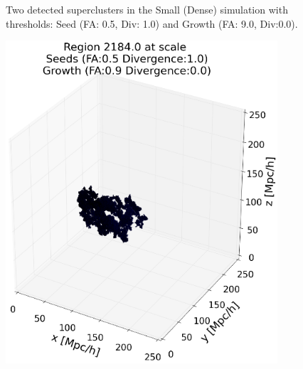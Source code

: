 \documentclass[12pt]{article}
\begin{document}
\begin{figure}[ht]
\begin{minipage}{.5\textwidth}
\end{minipage}
\label{fg:detected_small_51_90}
\caption{Two detected superclusters in the Small (Dense) simulation with thresholds: Seed (FA: 0.5, Div: 1.0) and Growth (FA: 9.0, Div:0.0). }
\end{figure}
\FloatBarrier

\begin{figure}[ht]
\centering
\begin{minipage}{.5\textwidth}
  \centering
  \includegraphics[width=0.9\textwidth]{groups/3d/seeds_FA_5/region_2184_scale_seeds_FA_05_Trace_10_search_FA_09_Trace_00_.png} %
\end{minipage}%
\begin{minipage}{.5\textwidth}
  \centering

\end{minipage}
\end{figure}
\end{document}
